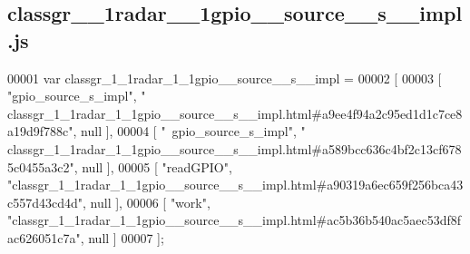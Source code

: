 \subsection{classgr\+\_\+\_\+1radar\+\_\+\_\+1gpio\+\_\+\+\_\+source\+\_\+\+\_\+s\+\_\+\+\_\+impl.\+js}
\label{classgr__1__1radar__1__1gpio____source____s____impl_8js_source}

\begin{DoxyCode}
00001 var classgr_1_1radar_1_1gpio__source__s__impl =
00002 [
00003     [ \textcolor{stringliteral}{"gpio\_source\_s\_impl"}, \textcolor{stringliteral}{"
      classgr\_1\_1radar\_1\_1gpio\_\_source\_\_s\_\_impl.html#a9ee4f94a2c95ed1d1c7ce8a19d9f788c"}, null ],
00004     [ \textcolor{stringliteral}{"~gpio\_source\_s\_impl"}, \textcolor{stringliteral}{"
      classgr\_1\_1radar\_1\_1gpio\_\_source\_\_s\_\_impl.html#a589bcc636c4bf2c13cf6785c0455a3c2"}, null ],
00005     [ \textcolor{stringliteral}{"readGPIO"}, \textcolor{stringliteral}{"classgr\_1\_1radar\_1\_1gpio\_\_source\_\_s\_\_impl.html#a90319a6ec659f256bca43c557d43cd4d"}, null 
      ],
00006     [ \textcolor{stringliteral}{"work"}, \textcolor{stringliteral}{"classgr\_1\_1radar\_1\_1gpio\_\_source\_\_s\_\_impl.html#ac5b36b540ac5aec53df8fac626051c7a"}, null ]
00007 ];
\end{DoxyCode}

